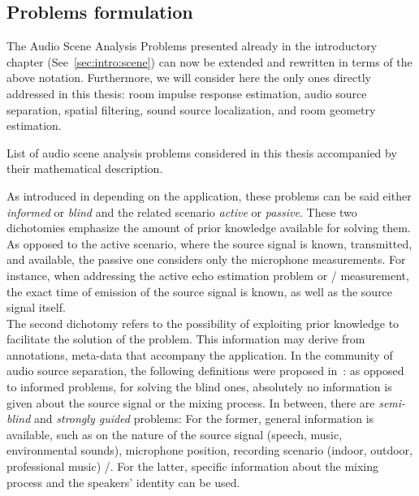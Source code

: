 \subsection{Problems formulation}
The Audio Scene Analysis Problems presented already in the introductory chapter (See~\cref{sec:intro:scene}) can now be extended and rewritten in terms of the above notation.
Furthermore, we will consider here the only ones directly addressed in this thesis: room impulse response estimation, audio source separation, spatial filtering, sound source localization, and room geometry estimation.

\begin{table}[!h]

    \begin{fullwidth}
    \centering
    \small
    \renewcommand{\arraystretch}{1.3}

    
    \caption{List of audio scene analysis problems considered in this thesis accompanied by their mathematical description.}
    \label{tab:processing:problems}

    \end{fullwidth}

\end{table}

\mynewline
As introduced in depending on the application, these problems can be said either \textit{informed} or \textit{blind} and the related scenario \textit{active} or \textit{passive}.
These two dichotomies emphasize the amount of prior knowledge available for solving them.
As opposed to the active scenario, where the source signal is known, transmitted, and available, the passive one considers only the microphone measurements.
For instance, when addressing the active echo estimation problem or \RIR/ measurement, the exact time of emission of the source signal is known, as well as the source signal itself.
\\The second dichotomy refers to the possibility of exploiting prior knowledge to facilitate the solution of the problem.
This information may derive from annotations, meta-data that accompany the application.
In the community of audio source separation, the following definitions were proposed in~:
as opposed to informed problems, for solving the blind ones, absolutely no information is given about the source signal or the mixing process.
In between, there are \textit{semi-blind} and \textit{strongly guided} problems:
For the former, general information is available, such as on the nature of the source signal (speech, music, environmental sounds),
microphone position, recording scenario (indoor, outdoor, professional music) \etc/.
For the latter, specific information about the mixing process and the speakers' identity can be used.

